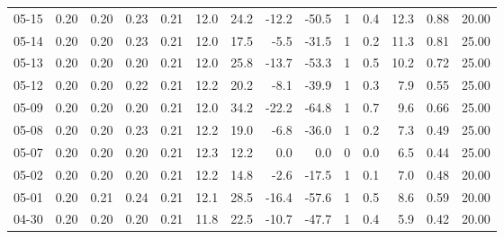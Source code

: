 \begin{threeparttable}
{\begin{tabular}{lrrrrrrrrrrrrr}
  05-15 &          0.20 &          0.20 &          0.23 &        0.21 &                12.0 &                24.2 &      -12.2 &        -50.5 &              1 &                 0.4 &             12.3 &            0.88 &                  20.00 \\
  05-14 &          0.20 &          0.20 &          0.23 &        0.21 &                12.0 &                17.5 &       -5.5 &        -31.5 &              1 &                 0.2 &             11.3 &            0.81 &                  25.00 \\
  05-13 &          0.20 &          0.20 &          0.20 &        0.21 &                12.0 &                25.8 &      -13.7 &        -53.3 &              1 &                 0.5 &             10.2 &            0.72 &                  25.00 \\
  05-12 &          0.20 &          0.20 &          0.22 &        0.21 &                12.2 &                20.2 &       -8.1 &        -39.9 &              1 &                 0.3 &              7.9 &            0.55 &                  25.00 \\
  05-09 &          0.20 &          0.20 &          0.20 &        0.21 &                12.0 &                34.2 &      -22.2 &        -64.8 &              1 &                 0.7 &              9.6 &            0.66 &                  25.00 \\
  05-08 &          0.20 &          0.20 &          0.23 &        0.21 &                12.2 &                19.0 &       -6.8 &        -36.0 &              1 &                 0.2 &              7.3 &            0.49 &                  25.00 \\
  05-07 &          0.20 &          0.20 &          0.20 &        0.21 &                12.3 &                12.2 &        0.0 &          0.0 &              0 &                 0.0 &              6.5 &            0.44 &                  25.00 \\
  05-02 &          0.20 &          0.20 &          0.20 &        0.21 &                12.2 &                14.8 &       -2.6 &        -17.5 &              1 &                 0.1 &              7.0 &            0.48 &                  20.00 \\
  05-01 &          0.20 &          0.21 &          0.24 &        0.21 &                12.1 &                28.5 &      -16.4 &        -57.6 &              1 &                 0.5 &              8.6 &            0.59 &                  20.00 \\
  04-30 &          0.20 &          0.20 &          0.20 &        0.21 &                11.8 &                22.5 &      -10.7 &        -47.7 &              1 &                 0.4 &              5.9 &            0.42 &                  20.00 \\

\end{tabular}}
\end{threeparttable}
